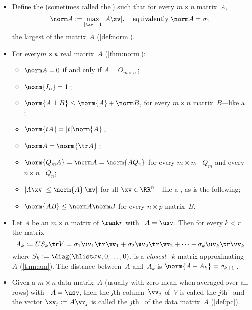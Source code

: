 \begin{itemize}
\item Define the  (sometimes called the ) such that for every \(m\times n\) matrix~\(A\), 
\begin{equation*}
\norm A:=\max_{|\xv|=1}|A\xv|, 
\quad\text{equivalently }\norm A=\sigma_1
\end{equation*}
the largest  of the matrix~\(A\) (\autoref{def:norm}).

\item For every\(m\times n\) real matrix~\(A\) (\autoref{thm:norm}):
\begin{itemize}
\item \(\norm A=0\) if and only if \(A=O_{m\times n}\)\,;
\item \(\norm{I_n}=1\)\,;
\item \(\norm {A\pm B}\leq\norm{A}+\norm B\), for every \(m\times n\) matrix~\(B\)---like a ;
\item \(\norm{tA}=|t|\norm{A}\)\,;
\item \(\norm A=\norm{\tr A}\)\,;
\item \(\norm{Q_mA}=\norm A=\norm{AQ_n}\) for every \(m\times m\) ~\(Q_m\) and every \(n\times n\) ~\(Q_n\);
\item \(|A\xv|\leq\norm{A}|\xv|\) for all \(\xv\in\RR^n\)---like a , as is the following;
\item \(\norm{AB}\leq\norm A\norm B\) for every \(n\times p\) matrix~\(B\).
\end{itemize}

\item Let \(A\) be an \(m\times n\) matrix of \(\rank r\) with \svd\ \(A=\usv\).  
Then for every \(k< r\) the matrix
\begin{equation*}
A_k:=US_k\tr V =\sigma_1\uv_1\tr\vv_1 +\sigma_2\uv_2\tr\vv_2+\cdots +\sigma_k\uv_k\tr\vv_k
\end{equation*}
where \(S_k:=\diag(\hlist\sigma k,0,\ldots,0)\), is a \emph{closest} ~\(k\) matrix approximating~\(A\) (\autoref{thm:am}).
The distance between~\(A\) and~\(A_k\) is \(\norm{A-A_k}=\sigma_{k+1}\)\,.

\item Given a \(m\times n\) data matrix~\(A\) (usually with zero mean when averaged over all rows) with  \svd\ \(A=\usv\), then the \(j\)th column~\(\vv_j\) of~\(V\) is called the \(j\)th~ and the vector \(\xv_j:=A\vv_j\) is called the \(j\)th~ of the data matrix~\(A\) (\autoref{def:pc}).


\end{itemize}
